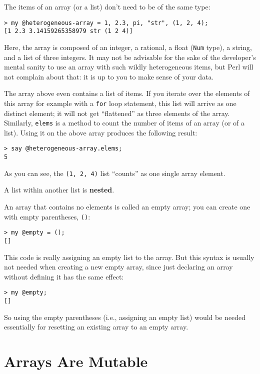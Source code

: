 The items of an array (or a list) don't need to be of the 
same type:

\begin{verbatim}
> my @heterogeneous-array = 1, 2.3, pi, "str", (1, 2, 4);
[1 2.3 3.14159265358979 str (1 2 4)]
\end{verbatim}

Here, the array is composed of an integer, a rational, a 
float ({\tt Num} type), a string, and a list of three integers. 
It may not be advisable for the sake of the developer's 
mental sanity to use an array with such wildly heterogeneous 
items, but Perl will not complain about that: it is up 
to you to make sense of your data.

The array above even contains a list of items. If you iterate 
over the elements of this array for example with a {\tt for} 
loop statement, this list will arrive as one distinct element; 
it will not get ``flattened'' as three elements 
of the array. Similarly, {\tt elems} is a method to 
count the number of items of an array (or of a list). 
Using it on the above array produces the following result:

\begin{verbatim}
> say @heterogeneous-array.elems;
5
\end{verbatim}
%

As you can see, the \verb'(1, 2, 4)' list ``counts'' 
as one single array element.

A list within another list is {\bf nested}.

An array that contains no elements is
called an empty array; you can create one with empty
parentheses, \verb"()":
\begin{verbatim}
> my @empty = ();
[]
\end{verbatim}

This code is really assigning an empty list to the array. But 
this syntax is usually not needed when creating a new empty array, 
since just declaring an array without defining it has the same 
effect:

\begin{verbatim}
> my @empty;
[]
\end{verbatim}

So using the empty parentheses (i.e., assigning an empty list) 
would be needed essentially for resetting an existing array to 
an empty array.


\section{Arrays Are Mutable}
\label{mutable}

